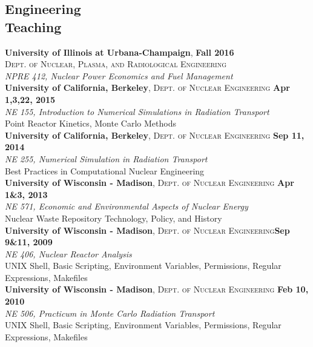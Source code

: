 \documentclass[margin,line]{resume}
\begin{document}
\begin{resume}
    \section{\mysidestyle Engineering\\Teaching}
    \textbf{University of Illinois at Urbana-Champaign}, \hfill \textbf{Fall 2016}\\
    \textsc{Dept. of Nuclear, Plasma, and Radiological Engineering}\\ 
               \textsl{NPRE 412, Nuclear Power Economics and Fuel Management}
               \vspace{2mm}\\
    \textbf{University of California, Berkeley}, \textsc{Dept. of Nuclear Engineering} \hfill \textbf{Apr 1,3,22, 2015}\\
               \textsl{NE 155, Introduction to Numerical Simulations in Radiation Transport}\\
               Point Reactor Kinetics, Monte Carlo Methods 
               \vspace{2mm}\\
    \textbf{University of California, Berkeley}, \textsc{Dept. of Nuclear Engineering} \hfill \textbf{Sep 11, 2014}\\
               \textsl{NE 255, Numerical Simulation in Radiation Transport}\\
               Best Practices in Computational Nuclear Engineering
               \vspace{2mm}\\
    \textbf{University of Wisconsin - Madison}, \textsc{Dept. of Nuclear Engineering} \hfill \textbf{Apr 1\&3, 2013}\\
               \textsl{NE 571, Economic and Environmental Aspects of Nuclear Energy}\\
               Nuclear Waste Repository Technology, Policy, and History
               \vspace{2mm}\\
    \textbf{University of Wisconsin - Madison}, \textsc{Dept. of Nuclear Engineering}\hfill \textbf{Sep 9\&11, 2009}\\
               \textsl{NE 406, Nuclear Reactor Analysis}\\
               UNIX Shell, Basic Scripting, Environment Variables, Permissions, Regular Expressions, Makefiles
               \vspace{2mm}\\
    \textbf{University of Wisconsin - Madison}, \textsc{Dept. of Nuclear
    Engineering} \hfill \textbf{Feb 10, 2010}\\
               \textsl{NE 506, Practicum in Monte Carlo Radiation Transport}\\
               UNIX Shell, Basic Scripting, Environment Variables, Permissions, Regular Expressions, Makefiles
               \vspace{2mm}


\end{resume}
\end{document}
